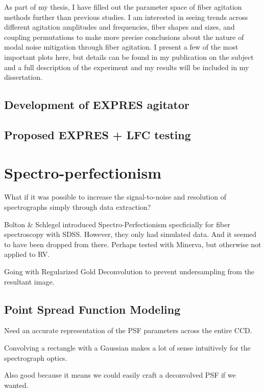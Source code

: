\documentclass[11pt]{article}
\begin{document}
As part of my thesis, I have filled out the parameter space of fiber agitation methods further than previous studies. I am interested in seeing trends across different agitation amplitudes and frequencies, fiber shapes and sizes, and coupling permutations to make more precise conclusions about the nature of modal noise mitigation through fiber agitation. I present a few of the most important plots here, but details can be found in my publication on the subject \cite{Petersburg2018} and a full description of the experiment and my results will be included in my dissertation.



\subsection{Development of EXPRES agitator}
\label{subsec:modal_noise_agitator}

\subsection{Proposed EXPRES + LFC testing}
\label{subsec:modal_noise_exp}

\section{Spectro-perfectionism}
\label{sec:spec_perf}

What if it was possible to increase the signal-to-noise and resolution of spectrographs simply through data extraction?

Bolton \& Schlegel introduced Spectro-Perfectionism specficially for fiber spectroscopy with SDSS. However, they only had simulated data. And it seemed to have been dropped from there. Perhaps tested with Minerva, but otherwise not applied to RV.

Going with Regularized Gold Deconvolution to prevent undersampling from the resultant image.

\subsection{Point Spread Function Modeling}

Need an accurate representation of the PSF parameters across the entire CCD.

Convolving a rectangle with a Gaussian makes a lot of sense intuitively for the spectrograph optics.

Also good because it means we could easily craft a deconvolved PSF if we wanted.
\end{document}
